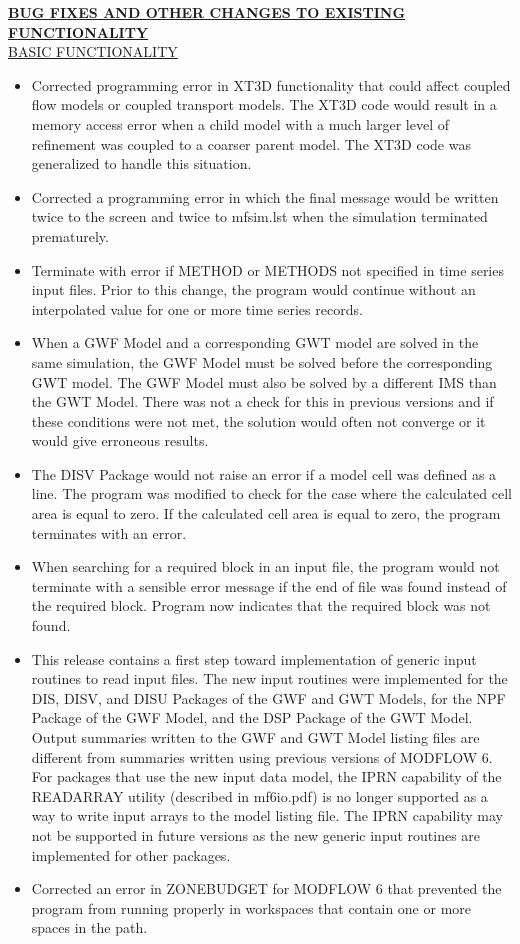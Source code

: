 	\textbf{\underline{BUG FIXES AND OTHER CHANGES TO EXISTING FUNCTIONALITY}} \\
	\underline{BASIC FUNCTIONALITY}
	\begin{itemize}
		\item Corrected programming error in XT3D functionality that could affect coupled flow models or coupled transport models.  The XT3D code would result in a memory access error when a child model with a much larger level of refinement was coupled to a coarser parent model.  The XT3D code was generalized to handle this situation. 
		\item Corrected a programming error in which the final message would be written twice to the screen and twice to mfsim.lst when the simulation terminated prematurely. 
		\item Terminate with error if METHOD or METHODS not specified in time series input files.  Prior to this change, the program would continue without an interpolated value for one or more time series records.
		\item When a GWF Model and a corresponding GWT model are solved in the same simulation, the GWF Model must be solved before the corresponding GWT model.  The GWF Model must also be solved by a different IMS than the GWT Model.  There was not a check for this in previous versions and if these conditions were not met, the solution would often not converge or it would give erroneous results.
		\item The DISV Package would not raise an error if a model cell was defined as a line.  The program was modified to check for the case where the calculated cell area is equal to zero.  If the calculated cell area is equal to zero, the program terminates with an error.
		\item When searching for a required block in an input file, the program would not terminate with a sensible error message if the end of file was found instead of the required block.  Program now indicates that the required block was not found.
		\item This release contains a first step toward implementation of generic input routines to read input files.  The new input routines were implemented for the DIS, DISV, and DISU Packages of the GWF and GWT Models, for the NPF Package of the GWF Model, and the DSP Package of the GWT Model.  Output summaries written to the GWF and GWT Model listing files are different from summaries written using previous versions of MODFLOW 6.  For packages that use the new input data model, the IPRN capability of the READARRAY utility (described in mf6io.pdf) is no longer supported as a way to write input arrays to the model listing file.  The IPRN capability may not be supported in future versions as the new generic input routines are implemented for other packages.
		\item Corrected an error in ZONEBUDGET for MODFLOW 6 that prevented the program from running properly in workspaces that contain one or more spaces in the path.
	\end{itemize}

